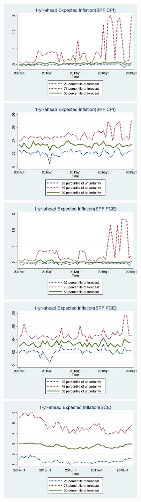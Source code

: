 \documentclass[]{article}
\begin{document}
	
	\begin{figure}[ht]
		\centering
		\includegraphics[width=7cm]{figures/IQRmeanCPIQ.png} 
		\includegraphics[width=7cm]{figures/IQRvarCPIQ.png} \\
		\smallskip
		\includegraphics[width=7cm]{figures/IQRmeanPCEQ.png}
		\includegraphics[width=7cm]{figures/IQRvarPCEQ.png}\\
		\smallskip
		\includegraphics[width=7cm]{figures/IQRmeanSCEM.png}

\end{figure}
\end{document}
